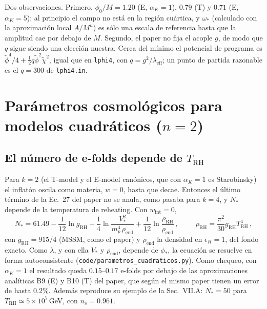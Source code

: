\documentclass[11pt]{article}
\begin{document}
            Dos observaciones. Primero, $\phi_0/M = 1.20$ (E, $\alpha_K = 1$), $0.79$ (T) y $0.71$ (E, $\alpha_K = 5$): al principio el campo no está en la región cuártica, y $\omega_*$ (calculado con la aproximación local $A/M^n$) es sólo una escala de referencia hasta que la amplitud cae por debajo de $M$. Segundo, el paper no fija el acople $g$, de modo que $q$ sigue siendo una elección nuestra. Cerca del mínimo el potencial de programa es $\tilde\phi^4/4 + \tfrac12 q \tilde\phi^2\tilde\chi^2$, igual que en \texttt{lphi4}, con $q = g^2/\lambda_{\text{eff}}$; un punto de partida razonable es el $q = 300$ de \texttt{lphi4.in}.

    \section{Parámetros cosmológicos para modelos cuadráticos ($n = 2$)}
        \label{sec:parametros-cuadraticos}

        \subsection{El número de e-folds depende de $T_{\text{RH}}$}

            Para $k = 2$ (el T-model y el E-model canónicos, que con $\alpha_K = 1$ es Starobinsky) el inflatón oscila como materia, $w = 0$, hasta que decae. Entonces el último término de la Ec.~27 del paper no se anula, como pasaba para $k = 4$, y $N_*$ depende de la temperatura de reheating. Con $w_{\text{int}} = 0$,
            \begin{equation}
                N_* = 61.49 - \frac{1}{12}\ln g_{\text{RH}} + \frac14 \ln\frac{V_*^2}{m_p^4\,\rho_{\text{end}}} + \frac{1}{12}\ln\frac{\rho_{\text{RH}}}{\rho_{\text{end}}} \, ,
                \hspace{1cm}
                \rho_{\text{RH}} = \frac{\pi^2}{30} g_{\text{RH}} T_{\text{RH}}^4 \, ,
            \end{equation}
            con $g_{\text{RH}} = 915/4$ (MSSM, como el paper) y $\rho_{\text{end}}$ la densidad en $\epsilon_H = 1$, del fondo exacto. Como $\lambda$, y con ella $V_*$ y $\rho_{\text{end}}$, depende de $\phi_*$, la ecuación se resuelve en forma autoconsistente (\texttt{code/parametros\_cuadraticos.py}). Como chequeo, con $\alpha_K = 1$ el resultado queda $0.15$--$0.17$ e-folds por debajo de las aproximaciones analíticas B9 (E) y B10 (T) del paper, que según el mismo paper tienen un error de hasta $0.2\%$. Además reproduce su ejemplo de la Sec.~VII.A: $N_* = 50$ para $T_{\text{RH}} \simeq 5 \times 10^7$\,GeV, con $n_s = 0.961$.
\end{document}
